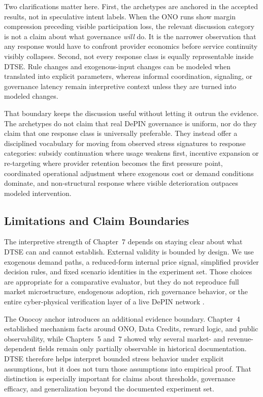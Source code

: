 Two clarifications matter here. First, the archetypes are anchored in the accepted results, not in speculative intent labels. When the ONO runs show margin compression preceding visible participation loss, the relevant discussion category is not a claim about what governance \emph{will} do. It is the narrower observation that any response would have to confront provider economics before service continuity visibly collapses. Second, not every response class is equally representable inside DTSE. Rule changes and exogenous-input changes can be modeled when translated into explicit parameters, whereas informal coordination, signaling, or governance latency remain interpretive context unless they are turned into modeled changes.

That boundary keeps the discussion useful without letting it outrun the evidence. The archetypes do not claim that real DePIN governance is uniform, nor do they claim that one response class is universally preferable. They instead offer a disciplined vocabulary for moving from observed stress signatures to response categories: subsidy continuation where usage weakens first, incentive expansion or re-targeting where provider retention becomes the first pressure point, coordinated operational adjustment where exogenous cost or demand conditions dominate, and non-structural response where visible deterioration outpaces modeled intervention.

\subsection{Limitations and Claim Boundaries}
The interpretive strength of Chapter~7 depends on staying clear about what DTSE can and cannot establish. External validity is bounded by design. We use exogenous demand paths, a reduced-form internal price signal, simplified provider decision rules, and fixed scenario identities in the experiment set. Those choices are appropriate for a comparative evaluator, but they do not reproduce full market microstructure, endogenous adoption, rich governance behavior, or the entire cyber-physical verification layer of a live DePIN network \cite{Morris2019, Braakman2022, Collins2024}.

The Onocoy anchor introduces an additional evidence boundary. Chapter~4 established mechanism facts around ONO, Data Credits, reward logic, and public observability, while Chapters~5 and~7 showed why several market- and revenue-dependent fields remain only partially observable in historical documentation. DTSE therefore helps interpret bounded stress behavior under explicit assumptions, but it does not turn those assumptions into empirical proof. That distinction is especially important for claims about thresholds, governance efficacy, and generalization beyond the documented experiment set.

